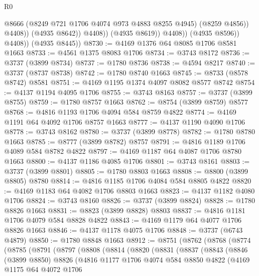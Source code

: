 \begin{lexlean}{R0}
\begin{coremodule}
                              @8666
                              (@8249 @721 @1706 @4074 @973 @4883 @8255 @4945)
                              (@8259 @4856))
                            @4408))
                        (@4935 @8642))
                      @4408))
                  (@4935 @8619))
                @4408))
            (@4935 @8596))
          @4408))
      (@4935 @8445))
@8730 := @4169 @1376 @64 @8085 @1706 @8581 @1663
@8733 := @4561 @1375 @8083 @1706
@8734 := @3743 @8172
@8736 := @3737 (@3899 @8734)
@8737 := @1780 @8736
@8738 := @4594 @8217
@8740 := @3737 (@8737 @8738)
@8742 := @1780 @8740 @1663
@8745 := @8733 (@8578 @8742) @8581
@8751 := @4169 @1195 @1374 @4097 @8082 @8577 @8742
@8754 := @4137 @1194 @4095 @1706
@8755 := @3743 @8163
@8757 := @3737 (@3899 @8755)
@8759 := @1780 @8757 @1663
@8762 := @8754 (@3899 @8759) @8577
@8768 := @4816 @1193 @1706 @4094 @584 @8759 @4822
@8774 := @4169 @1191 @64 @4092 @1706 @8757 @1663
@8777 := @4137 @1190 @4090 @1706
@8778 := @3743 @8162
@8780 := @3737 (@3899 @8778)
@8782 := @1780 @8780 @1663
@8785 := @8777 (@3899 @8782) @8757
@8791 := @4816 @1189 @1706 @4089 @584 @8782 @4822
@8797 := @4169 @1187 @64 @4087 @1706 @8780 @1663
@8800 := @4137 @1186 @4085 @1706
@8801 := @3743 @8161
@8803 := @3737 (@3899 @8801)
@8805 := @1780 @8803 @1663
@8808 := @8800 (@3899 @8805) @8780
@8814 := @4816 @1185 @1706 @4084 @584 @8805 @4822
@8820 := @4169 @1183 @64 @4082 @1706 @8803 @1663
@8823 := @4137 @1182 @4080 @1706
@8824 := @3743 @8160
@8826 := @3737 (@3899 @8824)
@8828 := @1780 @8826 @1663
@8831 := @8823 (@3899 @8828) @8803
@8837 := @4816 @1181 @1706 @4079 @584 @8828 @4822
@8843 := @4169 @1179 @64 @4077 @1706 @8826 @1663
@8846 := @4137 @1178 @4075 @1706
@8848 := @3737 (@6743 @4879)
@8850 := @1780 @8848 @1663
@8912 := @8751
    (@8762
      (@8768
        (@8774
          (@8785
            (@8791
              (@8797
                (@8808
                  (@8814
                    (@8820
                      (@8831
                        (@8837
                          (@8843
                            (@8846
                              (@3899 @8850)
                              @8826
                              (@4816
                                @1177
                                @1706
                                @4074
                                @584
                                @8850
                                @4822
                                (@4169
                                  @1175
                                  @64
                                  @4072
                                  @1706

\end{coremodule}
\end{lexlean}
